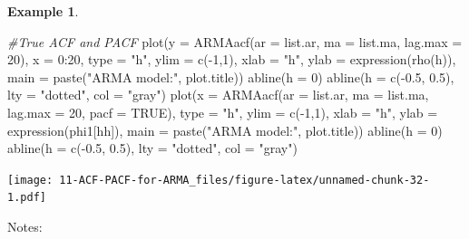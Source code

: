 \documentclass[
]{book}
\newenvironment{Shaded}{\begin{snugshade}}{\end{snugshade}}
\newcommand{\AttributeTok}[1]{\textcolor[rgb]{0.77,0.63,0.00}{#1}}
\newcommand{\CommentTok}[1]{\textcolor[rgb]{0.56,0.35,0.01}{\textit{#1}}}
\newcommand{\ConstantTok}[1]{\textcolor[rgb]{0.00,0.00,0.00}{#1}}
\newcommand{\DecValTok}[1]{\textcolor[rgb]{0.00,0.00,0.81}{#1}}
\newcommand{\FloatTok}[1]{\textcolor[rgb]{0.00,0.00,0.81}{#1}}
\newcommand{\FunctionTok}[1]{\textcolor[rgb]{0.00,0.00,0.00}{#1}}
\newcommand{\NormalTok}[1]{#1}
\newcommand{\SpecialCharTok}[1]{\textcolor[rgb]{0.00,0.00,0.00}{#1}}
\newcommand{\StringTok}[1]{\textcolor[rgb]{0.31,0.60,0.02}{#1}}
\theoremstyle{definition}
\theoremstyle{definition}
\newtheorem{example}{Example}[chapter]
\theoremstyle{definition}
\theoremstyle{definition}
\theoremstyle{remark}
\begin{document}
\begin{example}
\begin{Shaded}
\begin{Highlighting}[]
  
  \CommentTok{\#True ACF and PACF}
  \FunctionTok{plot}\NormalTok{(}\AttributeTok{y =} \FunctionTok{ARMAacf}\NormalTok{(}\AttributeTok{ar =}\NormalTok{ list.ar, }\AttributeTok{ma =}\NormalTok{ list.ma, }\AttributeTok{lag.max =} \DecValTok{20}\NormalTok{), }\AttributeTok{x =} \DecValTok{0}\SpecialCharTok{:}\DecValTok{20}\NormalTok{, }\AttributeTok{type =} \StringTok{"h"}\NormalTok{, }\AttributeTok{ylim =} \FunctionTok{c}\NormalTok{(}\SpecialCharTok{{-}}\DecValTok{1}\NormalTok{,}\DecValTok{1}\NormalTok{), }\AttributeTok{xlab =} \StringTok{"h"}\NormalTok{, }\AttributeTok{ylab =} \FunctionTok{expression}\NormalTok{(}\FunctionTok{rho}\NormalTok{(h)),}
    \AttributeTok{main =} \FunctionTok{paste}\NormalTok{(}\StringTok{"ARMA model:"}\NormalTok{, plot.title))}
  \FunctionTok{abline}\NormalTok{(}\AttributeTok{h =} \DecValTok{0}\NormalTok{)}
  \FunctionTok{abline}\NormalTok{(}\AttributeTok{h =} \FunctionTok{c}\NormalTok{(}\SpecialCharTok{{-}}\FloatTok{0.5}\NormalTok{, }\FloatTok{0.5}\NormalTok{), }\AttributeTok{lty =} \StringTok{"dotted"}\NormalTok{, }\AttributeTok{col =} \StringTok{"gray"}\NormalTok{)}
  \FunctionTok{plot}\NormalTok{(}\AttributeTok{x =} \FunctionTok{ARMAacf}\NormalTok{(}\AttributeTok{ar =}\NormalTok{ list.ar, }\AttributeTok{ma =}\NormalTok{ list.ma, }\AttributeTok{lag.max =} \DecValTok{20}\NormalTok{, }\AttributeTok{pacf =} \ConstantTok{TRUE}\NormalTok{), }\AttributeTok{type =} \StringTok{"h"}\NormalTok{, }\AttributeTok{ylim =} \FunctionTok{c}\NormalTok{(}\SpecialCharTok{{-}}\DecValTok{1}\NormalTok{,}\DecValTok{1}\NormalTok{), }\AttributeTok{xlab =} \StringTok{"h"}\NormalTok{, }\AttributeTok{ylab =} \FunctionTok{expression}\NormalTok{(phi1[hh]),}
    \AttributeTok{main =} \FunctionTok{paste}\NormalTok{(}\StringTok{"ARMA model:"}\NormalTok{, plot.title))}
  \FunctionTok{abline}\NormalTok{(}\AttributeTok{h =} \DecValTok{0}\NormalTok{)}
  \FunctionTok{abline}\NormalTok{(}\AttributeTok{h =} \FunctionTok{c}\NormalTok{(}\SpecialCharTok{{-}}\FloatTok{0.5}\NormalTok{, }\FloatTok{0.5}\NormalTok{), }\AttributeTok{lty =} \StringTok{"dotted"}\NormalTok{, }\AttributeTok{col =} \StringTok{"gray"}\NormalTok{)}
\end{Highlighting}
\end{Shaded}

\texttt{[image: 11-ACF-PACF-for-ARMA\_files/figure-latex/unnamed-chunk-32-1.pdf]}
\end{example}

Notes:
\end{document}

